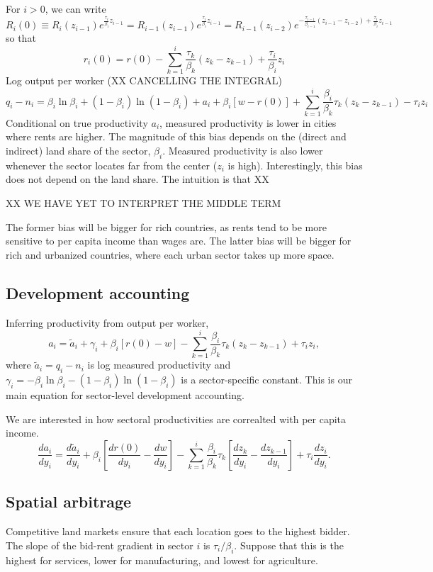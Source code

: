 \documentclass[12pt]{article}
\begin{document}
For $i>0$, we can write 
\[
R_i(0) \equiv R_i(z_{i-1})e^{\frac{\tau_i}{\beta_i}z_{i-1}} = R_{i-1}(z_{i-1})e^{\frac{\tau_i}{\beta_i}z_{i-1}}
= R_{i-1}(z_{i-2})
e^{-\frac{\tau_{i-1}}{\beta_{i-1}}(z_{i-1}-z_{i-2})+\frac{\tau_i}{\beta_i}z_{i-1}}
\]
so that
\[
r_i(0) = r(0)-\sum_{k=1}^i 
\frac{\tau_{k}}{\beta_{k}}(z_{k}-z_{k-1})
+ \frac{\tau_{i}}{\beta_{i}}z_{i}
\]
Log output per worker (XX CANCELLING THE INTEGRAL)
\[
q_i - n_i = 
\beta_i\ln\beta_i+(1-\beta_i)\ln(1-\beta_i)
+a_i +\beta_i [w
-r(0)]
+\sum_{k=1}^i 
\frac{\beta_i}{\beta_{k}}\tau_{k}(z_{k}-z_{k-1})
- \tau_{i}z_{i}
\]
Conditional on true productivity $a_i$, measured productivity is lower in cities where rents are higher. The magnitude of this bias depends on the (direct and indirect) land share of the sector, $\beta_i$. Measured productivity is also lower whenever the sector locates far from the center ($z_i$ is high). Interestingly, this bias does not depend on the land share. The intuition is that XX

XX WE HAVE YET TO INTERPRET THE MIDDLE TERM

The former bias will be bigger for rich countries, as rents tend to be more sensitive to per capita income than wages are. The latter bias will be bigger for rich and urbanized countries, where each urban sector takes up more space.

\subsection{Development accounting}

Inferring productivity from output per worker,
\[
a_i =  \tilde a_i +\gamma_i
+\beta_i [r(0)-w]
-\sum_{k=1}^i 
\frac{\beta_i}{\beta_{k}}\tau_{k}(z_{k}-z_{k-1})
+ \tau_{i}z_{i},
\]
where $\tilde a_i = q_i-n_i$ is log measured productivity and $\gamma_i = -\beta_i\ln\beta_i-(1-\beta_i)\ln(1-\beta_i)$ is a sector-specific constant. This is our main equation for sector-level development accounting.

We are interested in how sectoral productivities are correalted with per capita income.
\[
\frac{d a_i}{dy_i} = \frac{d \tilde a_i}{dy_i} +\beta_i \left[
\frac{d r(0)}{dy_i}-\frac{d w}{dy_i}\right]
-\sum_{k=1}^i 
\frac{\beta_i}{\beta_{k}}\tau_{k}\left[\frac{d z_k}{dy_i}-\frac{d z_{k-1}}{dy_i}\right]
+ \tau_{i}\frac{d z_i}{dy_i}.
\]


\subsection{Spatial arbitrage}
Competitive land markets ensure that each location goes to the highest bidder. The slope of the bid-rent gradient in sector $i$ is $\tau_i/\beta_i$. Suppose that this is the highest for services, lower for manufacturing, and lowest for agriculture.
\end{document}
